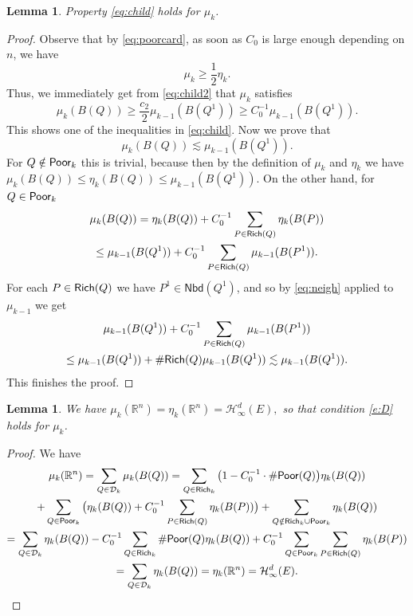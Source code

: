 \documentclass[11pt,reqno]{amsart}
\newcommand{\fr}[2]{\frac{#1}{#2}}
\newtheorem{lemma}[theorem]{Lemma}
\theoremstyle{definition}
\theoremstyle{remark}
\numberwithin{equation}{section}
\newcommand{\R}{\mathbb{R}}
\newcommand{\hdc}{\mathcal{H}^d_\infty}
\newcommand{\DD}{\mathcal{D}}
\newcommand{\Nei}{\mathsf{Nbd}}
\theoremstyle{theorem}
\theoremstyle{definition}
\theoremstyle{remark}
\numberwithin{equation}{section}
\begin{document}
\begin{lemma}
	Property \eqref{eq:child} holds for $\mu_k$.
\end{lemma}
\begin{proof}
	Observe that by \eqref{eq:poorcard}, as soon as $C_0$ is large enough depending on $n$, we have
	\begin{equation}\label{eq:muketak}
	\mu_k \ge \frac{1}{2} \eta_k.
	\end{equation}
	Thus, we immediately get from \eqref{eq:child2} that $\mu_k$ satisfies
	\begin{equation*}
	\mu_k(B(Q))\ge \fr{c_2}{2}\mu_{k-1}(B(Q^1))\ge C_0^{-1}\mu_{k-1}(B(Q^1)).
	\end{equation*}
	This shows one of the inequalities in \eqref{eq:child}. Now we prove that
	\begin{equation}
	\mu_k(B(Q))\lesssim \mu_{k-1}(B(Q^1)).
	\end{equation}
	For $Q\notin\mathsf{Poor}_k$ this is trivial, because then by the definition of $\mu_k$ and $\eta_k$ we have $\mu_k(B(Q))\le \eta_{k}(B(Q))\le \mu_{k-1}(B(Q^1))$. On the other hand, for $Q\in\mathsf{Poor}_k$
	\begin{multline*}
	\mu_k(B(Q)) = \eta_{k}(B(Q))+C_0^{-1}\sum_{P\in\mathsf{Rich}(Q)}\eta_{k}(B(P))\\
	\le \mu_{k-1}(B(Q^1)) + C_0^{-1}\sum_{P\in\mathsf{Rich}(Q)}\mu_{k-1}(B(P^1)).
	\end{multline*}
	For each $P\in\mathsf{Rich}(Q)$ we have $P^1\in\Nei(Q^1)$, and so by \eqref{eq:neigh} applied to $\mu_{k-1}$ we get
	\begin{multline*}
	\mu_{k-1}(B(Q^1)) + C_0^{-1}\sum_{P\in\mathsf{Rich}(Q)}\mu_{k-1}(B(P^1))\\
	\le \mu_{k-1}(B(Q^1)) + \#\mathsf{Rich}(Q)\mu_{k-1}(B(Q^1))\lesssim \mu_{k-1}(B(Q^1)).
	\end{multline*}
	This finishes the proof.
\end{proof}


\begin{lemma}
	We have $\mu_k(\R^n)=\eta_{k}(\R^n)=\hdc(E),$ so that condition \eqref{e:D} holds for $\mu_k$.
\end{lemma}
\begin{proof}
	We have
	\begin{multline*}
		\mu_k(\R^n) = \sum_{Q\in\DD_k}\mu_k(B(Q)) = \sum_{Q\in\Rich_k} \big(1-  C_0^{-1}\cdot \#\Poor(Q) \big)\eta_{k}(B(Q))\\
		+ \sum_{Q\in\Poor_k} \big(\eta_k(B(Q)) + C_0^{-1}\sum_{P\in\Rich(Q)} \eta_k(B(P))\big) + \sum_{Q\notin\Rich_k\cup\Poor_k}\eta_k(B(Q))\\
		= \sum_{Q\in\DD_k} \eta_k(B(Q)) - C_0^{-1}\sum_{Q\in\Rich_k}\#\Poor(Q)\eta_{k}(B(Q)) + C_0^{-1}\sum_{Q\in\Poor_k} \sum_{P\in\Rich(Q)} \eta_k(B(P))\\
		 = \sum_{Q\in\DD_k} \eta_k(B(Q)) = \eta_k(\R^n)=\hdc(E).
	\end{multline*}
\end{proof}
\end{document}
